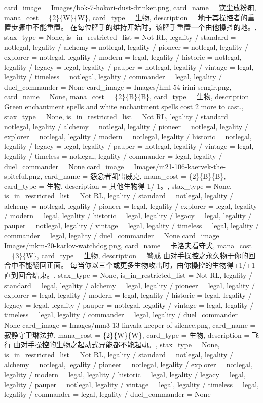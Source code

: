 \documentclass[lang = cn, color = black, 10pt]{AllThatStax}
\begin{document}
\card
{
	card_image = Images/bok-7-hokori-dust-drinker.png,
	card_name = 饮尘放粉痢,
	mana_cost = \{2\}\{W\}\{W\},
	card_type = 生物,
	description = 地于其操控者的重置步骤中不能重置。
	在每位牌手的维持开始时，该牌手重置一个由他操控的地。,
	stax_type = None,
	is_in_restricted_list = Not RL,
	legality / standard = notlegal,
	legality / alchemy = notlegal,
	legality / pioneer = notlegal,
	legality / explorer = notlegal,
	legality / modern = legal,
	legality / historic = notlegal,
	legality / legacy = legal,
	legality / pauper = notlegal,
	legality / vintage = legal,
	legality / timeless = notlegal,
	legality / commander = legal,
	legality / duel_commander = None
}
\card
{
	card_image = Images/hml-54-irini-sengir.png,
	card_name = None,
	mana_cost = \{2\}\{B\}\{B\},
	card_type = 生物,
	description = Green enchantment spells and white enchantment spells cost {2} more to cast.,
	stax_type = None,
	is_in_restricted_list = Not RL,
	legality / standard = notlegal,
	legality / alchemy = notlegal,
	legality / pioneer = notlegal,
	legality / explorer = notlegal,
	legality / modern = notlegal,
	legality / historic = notlegal,
	legality / legacy = legal,
	legality / pauper = notlegal,
	legality / vintage = legal,
	legality / timeless = notlegal,
	legality / commander = legal,
	legality / duel_commander = None
}
\card
{
	card_image = Images/m21-106-kaervek-the-spiteful.png,
	card_name = 怨忿者凯雷威克,
	mana_cost = \{2\}\{B\}\{B\},
	card_type = 生物,
	description = 其他生物得-1/-1。,
	stax_type = None,
	is_in_restricted_list = Not RL,
	legality / standard = notlegal,
	legality / alchemy = notlegal,
	legality / pioneer = legal,
	legality / explorer = legal,
	legality / modern = legal,
	legality / historic = legal,
	legality / legacy = legal,
	legality / pauper = notlegal,
	legality / vintage = legal,
	legality / timeless = legal,
	legality / commander = legal,
	legality / duel_commander = None
}
\card
{
	card_image = Images/mkm-20-karlov-watchdog.png,
	card_name = 卡洛夫看守犬,
	mana_cost = \{3\}\{W\},
	card_type = 生物,
	description = 警戒
	由对手操控之永久物于你的回合中不能翻回正面。
	每当你以三个或更多生物攻击时，由你操控的生物得+1/+1直到回合结束。,
	stax_type = None,
	is_in_restricted_list = Not RL,
	legality / standard = legal,
	legality / alchemy = legal,
	legality / pioneer = legal,
	legality / explorer = legal,
	legality / modern = legal,
	legality / historic = legal,
	legality / legacy = legal,
	legality / pauper = notlegal,
	legality / vintage = legal,
	legality / timeless = legal,
	legality / commander = legal,
	legality / duel_commander = None
}
\card
{
	card_image = Images/mm3-13-linvala-keeper-of-silence.png,
	card_name = 寂静守卫琳法拉,
	mana_cost = \{2\}\{W\}\{W\},
	card_type = 生物,
	description = 飞行
	由对手操控的生物之起动式异能都不能起动。,
	stax_type = None,
	is_in_restricted_list = Not RL,
	legality / standard = notlegal,
	legality / alchemy = notlegal,
	legality / pioneer = notlegal,
	legality / explorer = notlegal,
	legality / modern = legal,
	legality / historic = legal,
	legality / legacy = legal,
	legality / pauper = notlegal,
	legality / vintage = legal,
	legality / timeless = legal,
	legality / commander = legal,
	legality / duel_commander = None
}
\end{document}
